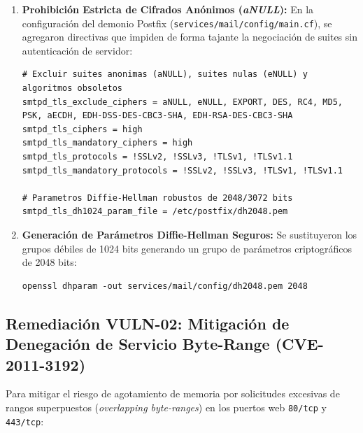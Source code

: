 \begin{enumerate}
  \item \textbf{Prohibición Estricta de Cifrados Anónimos (\textit{aNULL}):} En la configuración del demonio Postfix (\texttt{services/mail/config/main.cf}), se agregaron directivas que impiden de forma tajante la negociación de suites sin autenticación de servidor:
\begin{lstlisting}[style=terminal, caption={Endurecimiento Criptografico TLS en Postfix (main.cf)}, label={lst:mitigacion-postfix}]
# Excluir suites anonimas (aNULL), suites nulas (eNULL) y algoritmos obsoletos
smtpd_tls_exclude_ciphers = aNULL, eNULL, EXPORT, DES, RC4, MD5, PSK, aECDH, EDH-DSS-DES-CBC3-SHA, EDH-RSA-DES-CBC3-SHA
smtpd_tls_ciphers = high
smtpd_tls_mandatory_ciphers = high
smtpd_tls_protocols = !SSLv2, !SSLv3, !TLSv1, !TLSv1.1
smtpd_tls_mandatory_protocols = !SSLv2, !SSLv3, !TLSv1, !TLSv1.1

# Parametros Diffie-Hellman robustos de 2048/3072 bits
smtpd_tls_dh1024_param_file = /etc/postfix/dh2048.pem
\end{lstlisting}

  \item \textbf{Generación de Parámetros Diffie-Hellman Seguros:} Se sustituyeron los grupos débiles de 1024 bits generando un grupo de parámetros criptográficos de 2048 bits:
\begin{lstlisting}[style=terminal, caption={Comando OpenSSL para Parametros DH Fuertes}, label={lst:dhparam-cmd}]
openssl dhparam -out services/mail/config/dh2048.pem 2048
\end{lstlisting}
\end{enumerate}

\subsection{Remediación VULN-02: Mitigación de Denegación de Servicio Byte-Range (CVE-2011-3192)}

Para mitigar el riesgo de agotamiento de memoria por solicitudes excesivas de rangos superpuestos (\textit{overlapping byte-ranges}) en los puertos web \texttt{80/tcp} y \texttt{443/tcp}:

